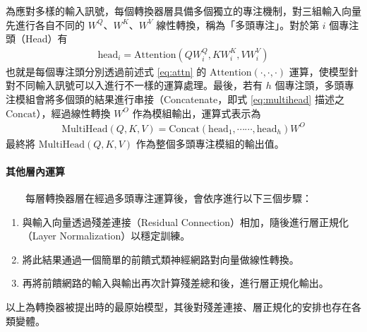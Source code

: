         為應對多樣的輸入訊號，每個轉換器層具備多個獨立的專注機制，對三組輸入向量先進行各自不同的 $W^Q$、$W^K$、$W^V$ 線性轉換，稱為「多頭專注」。對於第 $i$ 個專注頭（Head）有
\begin{align}
    \text{head}_i = \text{Attention}(QW^Q_i,KW^K_i,VW^V_i)
\end{align}
也就是每個專注頭分別透過前述式 \ref{eq:attn} 的 \(\text{Attention}(\cdot, \cdot, \cdot)\) 運算，使模型針對不同輸入訊號可以入進行不一樣的運算處理。最後，若有 $h$ 個專注頭，多頭專注模組會將多個頭的結果進行串接（Concatenate，即式 \ref{eq:multihead} 描述之 \( \text{Concat} \)），經過線性轉換 $W^O$ 作為模組輸出，運算式表示為
\begin{align}
    \text{MultiHead}(Q, K, V) = \text{Concat}(\text{head}_1, \cdots\cdots, \text{head}_h) W^O
    \label{eq:multihead}
\end{align}
最終將 \(\text{MultiHead}(Q, K, V)\) 作為整個多頭專注模組的輸出值。

\paragraph{其他層內運算} \hfill \break
%
　　每層轉換器層在經過多頭專注運算後，會依序進行以下三個步驟：

\begin{enumerate}
    \item 與輸入向量透過殘差連接（Residual Connection）相加，隨後進行層正規化（Layer Normalization）以穩定訓練。
    \item 將此結果通過一個簡單的前饋式類神經網路對向量做線性轉換。
    \item 再將前饋網路的輸入與輸出再次計算殘差總和後，進行層正規化輸出。
\end{enumerate}

        以上為轉換器被提出時的最原始模型，其後對殘差連接、層正規化的安排也存在各類變體。

